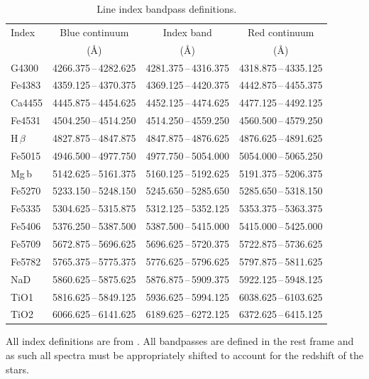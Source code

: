 		 	\begin{table}
				\centering
			\begin{threeparttable}
				\caption{Line index bandpass definitions.}
				\label{tab:abIndex}
				\begin{tabular}{l c c c}
					\hline
					\hline
					Index 	& Blue continuum & Index band & Red continuum \\
					 & (\AA) & (\AA) & (\AA) \\ 
					\hline 
					G4300 	& 4266.375\,--\,4282.625 & 4281.375\,--\,4316.375 & 4318.875\,--\,4335.125 \\
					Fe4383 	& 4359.125\,--\,4370.375 & 4369.125\,--\,4420.375 & 4442.875\,--\,4455.375 \\
					Ca4455 	& 4445.875\,--\,4454.625 & 4452.125\,--\,4474.625 & 4477.125\,--\,4492.125 \\
					Fe4531 	& 4504.250\,--\,4514.250 & 4514.250\,--\,4559.250 & 4560.500\,--\,4579.250 \\
					H\,$\beta$ & 4827.875\,--\,4847.875 & 4847.875\,--\,4876.625 & 4876.625\,--\,4891.625 \\
					Fe5015 	& 4946.500\,--\,4977.750 & 4977.750\,--\,5054.000 & 5054.000\,--\,5065.250 \\
					Mg\,b 	& 5142.625\,--\,5161.375 & 5160.125\,--\,5192.625 & 5191.375\,--\,5206.375 \\
					Fe5270 	& 5233.150\,--\,5248.150 & 5245.650\,--\,5285.650 & 5285.650\,--\,5318.150 \\
					Fe5335 	& 5304.625\,--\,5315.875 & 5312.125\,--\,5352.125 & 5353.375\,--\,5363.375 \\
					Fe5406 	& 5376.250\,--\,5387.500 & 5387.500\,--\,5415.000 & 5415.000\,--\,5425.000 \\
					Fe5709 	& 5672.875\,--\,5696.625 & 5696.625\,--\,5720.375 & 5722.875\,--\,5736.625 \\
					Fe5782 	& 5765.375\,--\,5775.375 & 5776.625\,--\,5796.625 & 5797.875\,--\,5811.625 \\
					NaD 	& 5860.625\,--\,5875.625 & 5876.875\,--\,5909.375 & 5922.125\,--\,5948.125 \\
					TiO1 	& 5816.625\,--\,5849.125 & 5936.625\,--\,5994.125 & 6038.625\,--\,6103.625 \\
					TiO2 	& 6066.625\,--\,6141.625 & 6189.625\,--\,6272.125 & 6372.625\,--\,6415.125 \\
					\hline
					\hline
				\end{tabular}
				\begin{tablenotes}
				\footnotesize
				\note All index definitions are from \citet{Trager1998}. All bandpasses are defined in the rest frame and as such all spectra must be appropriately shifted to account for the redshift of the stars. 
				\end{tablenotes}
			\end{threeparttable}
			\end{table}

